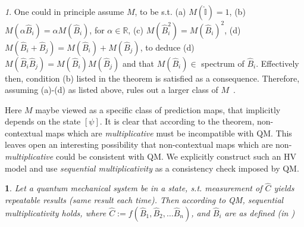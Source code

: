 \documentclass[british,aps,prl,superscriptaddress,nofootinbib,times,reprint]{revtex4-1}
\theoremstyle{plain}
\theoremstyle{plain}
\theoremstyle{definition}
\theoremstyle{remark}
\newtheorem*{rem}{\protect\remarkname}
\theoremstyle{remark}
\theoremstyle{remark}
\theoremstyle{plain}
\newtheorem*{prop*}{\protect\propositionname}
\theoremstyle{plain}
\theoremstyle{plain}
\theoremstyle{definition}
\theoremstyle{definition}
\providecommand{\propositionname}{Proposition}
\providecommand{\remarkname}{Remark}
\begin{document}
\begin{rem} One could in principle assume $M$, to
be s.t. (a) $M(\hat{\mathbb{I}})=1$, (b)
$M(\alpha\hat{B}_{i})=\alpha M(\hat{B}_{i})$, for
$\alpha\in\mathbb{R}$, (c)
$M(\hat{B}_{i}^{2})=M(\hat{B}_{i})^{2}$, (d)
$M(\hat{B}_{i}+\hat{B}_{j})=M(\hat{B}_{i})+M(\hat{B}_{j})$,
to deduce (d)
$M(\hat{B}_{i}\hat{B}_{j})=M(\hat{B}_{i})M(\hat{B}_{j})$
and that $M(\hat{B}_{i})\in$ spectrum of
$\hat{B}_{i}$. Effectively then, condition (b)
listed in the theorem is satisfied as a
consequence.  Therefore, assuming (a)-(d) as
listed above, rules out a larger class of
$M$~\cite{KochenSpecker}.
\end{rem} 
Here $M$ maybe viewed as a specific class of
prediction maps, that implicitly depends on the
state $[\psi]$. It is clear that according to the
theorem, non-contextual maps which are
\emph{multiplicative} must be incompatible with
QM. 
This leaves open an interesting possibility
that non-contextual maps which are
non-\emph{multiplicative} could be consistent with
QM. We explicitly construct such an HV model and use
\emph{sequential multiplicativity} as a consistency
check imposed by QM.
\begin{prop*} 
Let a quantum mechanical 
system be in a state, s.t. measurement of
$\hat{C}$ yields repeatable results (same result
each time). Then according to QM, \emph{sequential
multiplicativity} holds, where $\hat{C}:=
f(\hat{B}_{1},\hat{B}_{2},\dots\hat{B}_{n})$, and
$\hat{B}_{i}$ are as defined (in )
\end{prop*}
\end{document}
